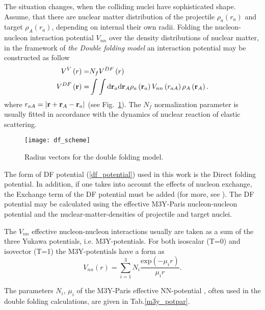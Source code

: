 \documentclass[
12pt, %
oneside, %
english, %
doublespacing, %
doublespacing, %
toctotoc, %
parskip, %
headsepline, %
]{MastersDoctoralThesis} %
\begin{document}
The situation changes, when the colliding nuclei have sophisticated shape. Assume, that there are nuclear matter distribution of the projectile $\rho_a \left( { r}_a \right) $ and target $\rho_A \left( { r}_a \right)$, depending on internal their own radii. Folding the nucleon-nucleon interaction potential $V_{nn}$ over the density distributions of nuclear matter, in the framework of \textit{the Double folding model} an interaction potential may be constructed as follow 
\begin{align}
V^V\left( r \right) = & N_f V^{DF} \left( r \right) \nonumber \\ 
V^{DF} \left( {\bf r} \right) = & \int \int \text{d} {\bf r}_a\text{d} {\bf r}_A
\rho_a \left( {\bf r}_a \right) V_{nn} \left( r_{aA}\right)  \rho_A \left( {\bf r}_A \right). 
\label{df_potential}
\end{align}
where $r_{aA}=\vert {\bf r} + {\bf r}_A - {\bf r}_a \vert$ (see Fig.~\ref{fig:df_scheme}). The $N_f$ normalization parameter is usually fitted in accordance with the dynamics of nuclear reaction of elastic scattering.

\begin{figure}
\centering
\texttt{[image: df\_scheme]}
\decoRule
\caption{  Radius vectors for the double folding model. }
\label{fig:df_scheme}
\end{figure}

The form of DF potential (\ref{df_potential}) used in this work is the Direct folding potential. In addition, if one takes into account the effects of nucleon exchange, the Exchange term of the DF potential must be added (for more, see \cite{luk2008double}).
The DF potential may be calculated using the effective M3Y-Paris \cite{anantaraman1983effective} nucleon-nucleon potential and the nuclear-matter-densities of projectile and target nuclei. 

 The $V_{nn}$ effective nucleon-nucleon interactions usually are taken as a sum of the three Yukawa potentials, i.e. M3Y-potentials. For both isoscalar (T=0) and isovector (T=1) the M3Y-potentials have a form as
 \begin{equation}
 V_{nn}(r)=\sum_{i=1}^{3} N_i \frac{\text{exp}(-\mu_i r)}{\mu_i r}.
 \end{equation}
 
 
The parameters  $N_i$, $\mu_i$ of the M3Y-Paris effective NN-potential \cite{anantaraman1983effective}, often used in the double folding calculations, are given in Tab.\ref{m3y_potpar}.
\end{document}
